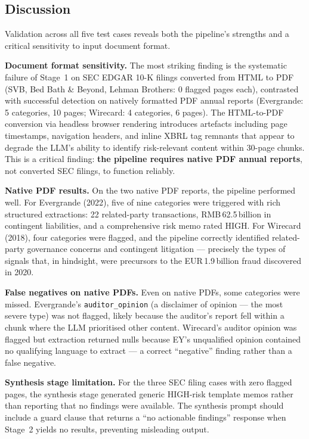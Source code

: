 \documentclass[12pt,a4paper]{article}
\begin{document}
\subsection{Discussion}

Validation across all five test cases reveals both the pipeline's strengths
and a critical sensitivity to input document format.

\textbf{Document format sensitivity.}
The most striking finding is the systematic failure of Stage~1 on SEC EDGAR
10-K filings converted from HTML to PDF (SVB, Bed Bath \& Beyond, Lehman
Brothers: 0 flagged pages each), contrasted with successful detection on
natively formatted PDF annual reports (Evergrande: 5 categories, 10 pages;
Wirecard: 4 categories, 6 pages). The HTML-to-PDF conversion via headless
browser rendering introduces artefacts including page timestamps, navigation
headers, and inline XBRL tag remnants that appear to degrade the LLM's
ability to identify risk-relevant content within 30-page chunks. This is a
critical finding: \textbf{the pipeline requires native PDF annual reports},
not converted SEC filings, to function reliably.

\textbf{Native PDF results.}
On the two native PDF reports, the pipeline performed well. For Evergrande
(2022), five of nine categories were triggered with rich structured
extractions: 22 related-party transactions, RMB\,62.5\,billion in
contingent liabilities, and a comprehensive risk memo rated HIGH. For
Wirecard (2018), four categories were flagged, and the pipeline
correctly identified related-party governance concerns and contingent
litigation --- precisely the types of signals that, in hindsight, were
precursors to the EUR\,1.9\,billion fraud discovered in 2020.

\textbf{False negatives on native PDFs.}
Even on native PDFs, some categories were missed. Evergrande's
\texttt{auditor\_opinion} (a disclaimer of opinion --- the most severe
type) was not flagged, likely because the auditor's report fell within a
chunk where the LLM prioritised other content. Wirecard's auditor opinion
was flagged but extraction returned nulls because EY's unqualified opinion
contained no qualifying language to extract --- a correct ``negative'' finding
rather than a false negative.

\textbf{Synthesis stage limitation.}
For the three SEC filing cases with zero flagged pages, the synthesis stage
generated generic HIGH-risk template memos rather than reporting that no
findings were available. The synthesis prompt should include a guard clause
that returns a ``no actionable findings'' response when Stage~2 yields no
results, preventing misleading output.
\end{document}
